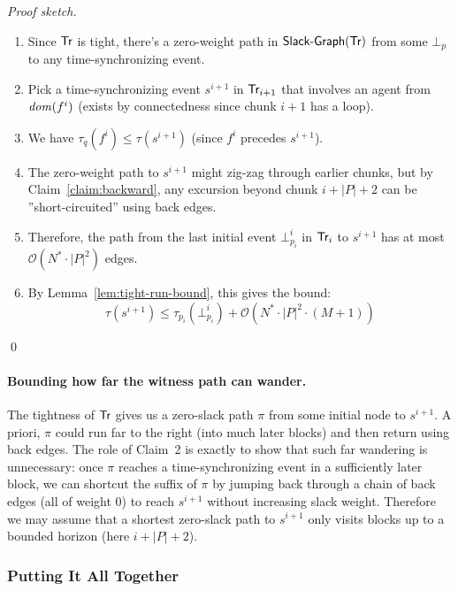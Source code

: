 \begin{proof}[Proof sketch]
\begin{enumerate}
\item Since $\textsf{Tr}$ is tight, there's a zero-weight path in $\mathrm{\textsf{Slack-Graph}}(\textsf{Tr})$ from some $\bot_p$ to any time-synchronizing event.

\item Pick a time-synchronizing event $s^{i+1}$ in $\textsf{Tr}_{i+1}$ that involves an agent from $\mathit{dom}(f^i)$ (exists by connectedness since chunk $i+1$ has a loop).

\item We have $\tau_q(f^i) \leq \tau(s^{i+1})$ (since $f^i$ precedes $s^{i+1}$).

\item The zero-weight path to $s^{i+1}$ might zig-zag through earlier chunks, but by Claim~\ref{claim:backward}, any excursion beyond chunk $i + |P| + 2$ can be ''short-circuited'' using back edges.

\item Therefore, the path from the last initial event $\bot^i_{p_i}$ in $\textsf{Tr}_i$ to $s^{i+1}$ has at most $\mathcal{O}(N^* \cdot |P|^2)$ edges.

\item By Lemma~\ref{lem:tight-run-bound}, this gives the bound:
  \[
  \tau(s^{i+1}) \leq \tau_{p_i}(\bot^i_{p_i}) + \mathcal{O}(N^* \cdot |P|^2 \cdot (M+1))
  \]
\end{enumerate}
\qed
\end{proof}

\paragraph*{Bounding how far the witness path can wander.}
The tightness of $\textsf{Tr}$ gives us a zero-slack path $\pi$ from some initial node to $s^{i+1}$. A priori, $\pi$ could run far to the right (into much later blocks) and then return using back edges. The role of Claim~2 is exactly to show that such far wandering is unnecessary: once $\pi$ reaches a time-synchronizing event in a sufficiently later block, we can shortcut the suffix of $\pi$ by jumping back through a chain of back edges (all of weight $0$) to reach $s^{i+1}$ without increasing slack weight. Therefore we may assume that a shortest zero-slack path to $s^{i+1}$ only visits blocks up to a bounded horizon (here $i+|P|+2$).

\subsubsection{Putting It All Together}

